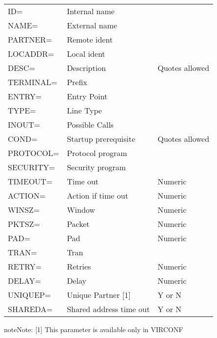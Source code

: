\documentclass[letterpaper,10pt,english]{sphinxmanual}
\begin{document}
\begin{savenotes}\sphinxattablestart
\centering
\begin{tabulary}{\linewidth}[t]{|T|T|T|}
\hline
{}\relax &\relax &\relax \\
\hline
ID=
&
Internal name
&\\
\hline
NAME=
&
External name
&\\
\hline
PARTNER=
&
Remote ident
&\\
\hline
LOCADDR=
&
Local ident
&\\
\hline
DESC=
&
Description
&
Quotes allowed
\\
\hline
TERMINAL=
&
Prefix
&\\
\hline
ENTRY=
&
Entry Point
&\\
\hline
TYPE=
&
Line Type
&\\
\hline
INOUT=
&
Possible Calls
&\\
\hline
COND=
&
Startup
prerequisite
&
Quotes allowed
\\
\hline
PROTOCOL=
&
Protocol program
&\\
\hline
SECURITY=
&
Security program
&\\
\hline
TIMEOUT=
&
Time out
&
Numeric
\\
\hline
ACTION=
&
Action if
time out
&
Numeric
\\
\hline
WINSZ=
&
Window
&
Numeric
\\
\hline
PKTSZ=
&
Packet
&
Numeric
\\
\hline
PAD=
&
Pad
&
Numeric
\\
\hline
TRAN=
&
Tran
&\\
\hline
RETRY=
&
Retries
&
Numeric
\\
\hline
DELAY=
&
Delay
&
Numeric
\\
\hline
UNIQUEP=
&
Unique Partner {[}1{]}
&
Y or N
\\
\hline
SHAREDA=
&
Shared address
time out
&
Y or N
\\
\hline
\end{tabulary}
\par
\sphinxattableend\end{savenotes}

\begin{sphinxadmonition}{note}{Note:}
{[}1{]} This parameter is available only in VIRCONF
\end{sphinxadmonition}

\end{document}

